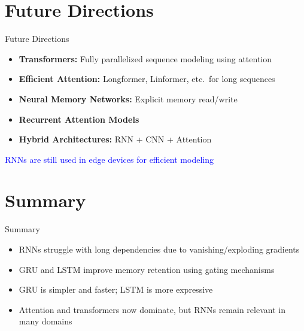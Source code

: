 \section{Future Directions}
\begin{frame}{Future Directions}
    \begin{itemize}
        \setlength{\itemsep}{1em}
        \item \textbf{Transformers:} Fully parallelized sequence modeling using attention
        \item \textbf{Efficient Attention:} Longformer, Linformer, etc.\ for long sequences
        \item \textbf{Neural Memory Networks:} Explicit memory read/write
        \item \textbf{Recurrent Attention Models}
        \item \textbf{Hybrid Architectures:} RNN + CNN + Attention
    \end{itemize}

    \vspace{1em}
    \textcolor{blue}{\faGlobe\enspace RNNs are still used in edge devices for efficient modeling}
\end{frame}

\section{Summary}
\begin{frame}{Summary}
    \begin{itemize}
        \setlength{\itemsep}{1em}
        \item RNNs struggle with long dependencies due to vanishing/exploding gradients
        \item GRU and LSTM improve memory retention using gating mechanisms
        \item GRU is simpler and faster; LSTM is more expressive
        \item Attention and transformers now dominate, but RNNs remain relevant in many domains
    \end{itemize}
\end{frame}


